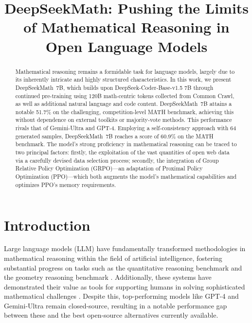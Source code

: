 \title{DeepSeekMath: Pushing the Limits of Mathematical Reasoning in Open Language Models}

\begin{abstract}
Mathematical reasoning remains a formidable task for language models, largely due to its inherently intricate and highly structured characteristics. In this work, we present DeepSeekMath~7B, which builds upon DeepSeek-Coder-Base-v1.5 7B through continued pre-training using 120B math-centric tokens collected from Common Crawl, as well as additional natural language and code content. DeepSeekMath~7B attains a notable 51.7\% on the challenging, competition-level MATH benchmark, achieving this without dependence on external toolkits or majority-vote methods. This performance rivals that of Gemini-Ultra and GPT-4. Employing a self-consistency approach with 64 generated samples, DeepSeekMath~7B reaches a score of 60.9\% on the MATH benchmark. The model’s strong proficiency in mathematical reasoning can be traced to two principal factors: firstly, the exploitation of the vast quantities of open web data via a carefully devised data selection process; secondly, the integration of Group Relative Policy Optimization (GRPO)—an adaptation of Proximal Policy Optimization (PPO)—which both augments the model’s mathematical capabilities and optimizes PPO’s memory requirements.
\end{abstract}

\section{Introduction}

Large language models (LLM) have fundamentally transformed methodologies in mathematical reasoning within the field of artificial intelligence, fostering substantial progress on tasks such as the quantitative reasoning benchmark \citep{MATH} and the geometry reasoning benchmark \citep{trinh2024solving}. Additionally, these systems have demonstrated their value as tools for supporting humans in solving sophisticated mathematical challenges \citep{tao}. Despite this, top-performing models like GPT-4 \citep{gpt4} and Gemini-Ultra \citep{gemini} remain closed-source, resulting in a notable performance gap between these and the best open-source alternatives currently available.

